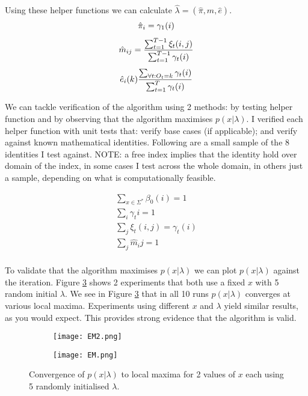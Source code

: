 Using these helper functions we can calculate $\hat{\lambda}=(\hat{\pi}, \hat{m}, \hat{e})$.
\begin{gather*}
    \hat{\pi}_i = \gamma_1(i)\biggbreak
    \hat{m}_{ij} = \frac{\sum_{t=1}^{T-1} \xi_t(i,j)}{\sum_{t=1}^{T-1} \gamma_t(i)}\biggbreak
    \hat{e}_i(k) \frac{\sum_{\forall t: O_t = k} \gamma_t(i)}{\sum_{t=1}^T \gamma_t(i)}
\end{gather*}


We can tackle verification of the algorithm using 2 methods: by testing helper function and by observing that the algorithm maximises $p(x|\lambda)$. I verified each helper function with unit tests that: verify base cases (if applicable); and verify against known mathematical identities. Following are a small sample of the 8 identities I test against. NOTE: a free index implies that the identity hold over domain of the index, in some cases I test across the whole domain, in others just a sample, depending on what is computationally feasible.

\begin{gather*}
    \sum_{x \in \Sigma^*} \beta_0(i) = 1\\
    \sum_{i} \gamma_t{i} = 1\\
    \sum_{j} \xi_t(i,j) = \gamma_t(i)\\
    \sum_j \hat{m}_ij = 1\\
\end{gather*}


To validate that the algorithm maximises $p(x|\lambda)$ we can plot $p(x|\lambda)$ against the iteration. Figure \ref{fig:em} shows 2 experiments that both use a fixed $x$ with 5 random initial $\lambda$. We see in Figure \ref{fig:em} that in all 10 runs $p(x|\lambda)$ converges at various local maxima. Experiments using different $x$ and $\lambda$ yield similar results, as you would expect. This provides strong evidence that the algorithm is valid.

\begin{figure}[h!]
    \begin{center}
    \begin{subfigure}{.5\textwidth}
        \begin{center}
    \texttt{[image: EM2.png]}
    \caption{}
    \label{fig:em1}
    \end{center}
    \end{subfigure}%
    \begin{subfigure}{.5\textwidth}
        \begin{center}
        \texttt{[image: EM.png]}
        \caption{}
        \label{fig:em2}
    \end{center}
        \end{subfigure}%
        \caption{Convergence of $p(x|\lambda)$ to local maxima for 2 values of $x$ each using 5 randomly initialised $\lambda$.}
    \label{fig:em}
    \end{center}
    \end{figure}